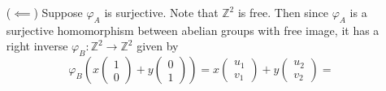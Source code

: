 \documentclass{article}
\begin{document}
\begin{Answer}
\begin{enumerate}[(a)]
{\begin{itemize}
{$$\begin{array}{c}
        \end{array}\right) =
        \varphi_A \left(
          x
          \left(\begin{array}{r}
            d \\ -c
          \end{array}\right) +
          y
          \left(\begin{array}{r}
            -b \\ a
          \end{array}\right)
        \right)
        $$
        Similarly if $\det(A) = -1$ we have
        $$
        \left(\begin{array}{c}
          x \\ y
        \end{array}\right) =
        \varphi_A \left(
          -x
          \left(\begin{array}{r}
            d \\ -c
          \end{array}\right) +
          -y
          \left(\begin{array}{r}
            -b \\ a
          \end{array}\right)
        \right)
        $$
        and therefore $(x, y) \in \mathrm{Im}(\varphi_A)$ in either of
        these cases. Therefore $\varphi_A$ is surjective.
      }
      \item[($\impliedby$)]
      {
        Suppose $\varphi_A$ is surjective.
        Note that $\mathbb{Z}^2$ is free.
        Then since $\varphi_A$ is a surjective homomorphism between
        abelian groups with free image, it has a right inverse
        $\varphi_B : \mathbb{Z}^2 \to \mathbb{Z}^2$ given by
        $$
        \varphi_B\left(
          x\left(\begin{array}{c}
            1 \\ 0
          \end{array}\right)
          +
          y\left(\begin{array}{c}
            0 \\ 1
          \end{array}\right)
        \right) =
        x\left(\begin{array}{c}
          u_1 \\ v_1
        \end{array}\right)
        +
        y\left(\begin{array}{c}
          u_2 \\ v_2
        \end{array}\right) =
$$}
\end{itemize}}
\end{enumerate}
\end{Answer}
\end{document}
